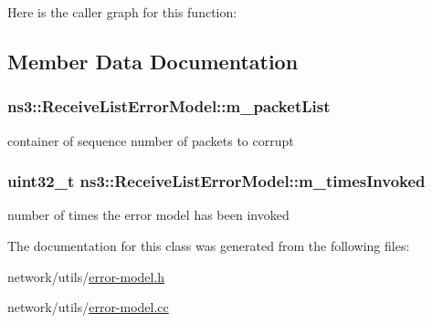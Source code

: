 Here is the caller graph for this function\+:




\subsection{Member Data Documentation}
\subsubsection[{\texorpdfstring{m\+\_\+packet\+List}{m_packetList}}]{ ns3\+::\+Receive\+List\+Error\+Model\+::m\+\_\+packet\+List\hspace{0.3cm}{\ttfamily [private]}}\hypertarget{classns3_1_1ReceiveListErrorModel_ab9caf37c0afa7fa86ea7805126714e9b}{}\label{classns3_1_1ReceiveListErrorModel_ab9caf37c0afa7fa86ea7805126714e9b}


container of sequence number of packets to corrupt 

\subsubsection[{\texorpdfstring{m\+\_\+times\+Invoked}{m_timesInvoked}}]{\setlength{\rightskip}{0pt plus 5cm}uint32\+\_\+t ns3\+::\+Receive\+List\+Error\+Model\+::m\+\_\+times\+Invoked\hspace{0.3cm}{\ttfamily [private]}}\hypertarget{classns3_1_1ReceiveListErrorModel_aa1ef42d0b5c25cf1bbbef9ca87e0b0cc}{}\label{classns3_1_1ReceiveListErrorModel_aa1ef42d0b5c25cf1bbbef9ca87e0b0cc}


number of times the error model has been invoked 



The documentation for this class was generated from the following files\+:\begin{DoxyCompactItemize}
\item 
network/utils/\hyperlink{error-model_8h}{error-\/model.\+h}\item 
network/utils/\hyperlink{error-model_8cc}{error-\/model.\+cc}\end{DoxyCompactItemize}
